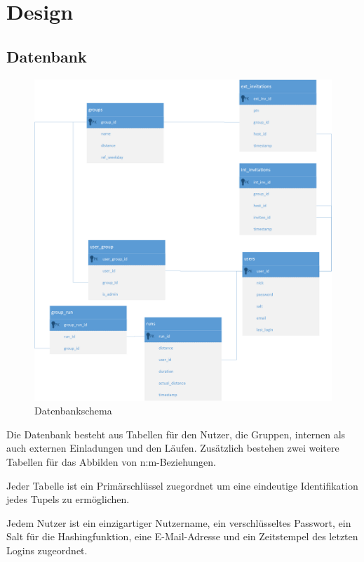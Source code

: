\section{Design}\label{kapitel5}
\subsection{Datenbank}
\begin{figure}[htb]
\centering
\includegraphics[width=\textwidth]{abb/er_diagram}
\caption{Datenbankschema}
\end{figure}
Die Datenbank besteht aus Tabellen für den Nutzer, die Gruppen, internen als auch externen Einladungen und den Läufen. Zusätzlich bestehen zwei weitere Tabellen für das Abbilden von n:m-Beziehungen.

Jeder Tabelle ist ein Primärschlüssel zuegordnet um eine eindeutige Identifikation jedes Tupels zu ermöglichen.

Jedem Nutzer ist ein einzigartiger Nutzername, ein verschlüsseltes Passwort, ein Salt für die Hashingfunktion, eine E-Mail-Adresse und ein Zeitstempel des letzten Logins zugeordnet.

